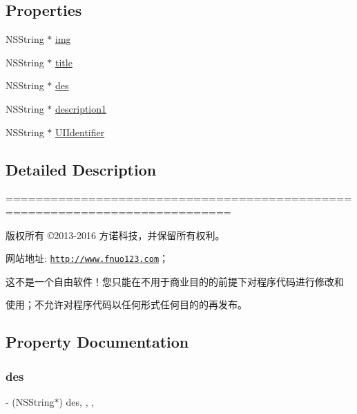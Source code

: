 \subsection*{Properties}
\begin{DoxyCompactItemize}
\item 
N\+S\+String $\ast$ \mbox{\hyperlink{interface_j_m_hi_buy_home_a_d_model_a31a8092309d30f01e0233e3afb662d29}{img}}
\item 
N\+S\+String $\ast$ \mbox{\hyperlink{interface_j_m_hi_buy_home_a_d_model_a1b33b36813e76156e9b6e4f3e2c71eea}{title}}
\item 
N\+S\+String $\ast$ \mbox{\hyperlink{interface_j_m_hi_buy_home_a_d_model_a9dd233c0678f678025b0b8998f6b8e8c}{des}}
\item 
N\+S\+String $\ast$ \mbox{\hyperlink{interface_j_m_hi_buy_home_a_d_model_ab7007b10dc44feb80b3946c683c6dd31}{description1}}
\item 
N\+S\+String $\ast$ \mbox{\hyperlink{interface_j_m_hi_buy_home_a_d_model_a8c115705a0f60975fe8e8d76936850d3}{U\+I\+Identifier}}
\end{DoxyCompactItemize}


\subsection{Detailed Description}
============================================================================

版权所有 ©2013-\/2016 方诺科技，并保留所有权利。

网站地址\+: \href{http://www.fnuo123.com}{\tt http\+://www.\+fnuo123.\+com}； 



这不是一个自由软件！您只能在不用于商业目的的前提下对程序代码进行修改和

使用；不允许对程序代码以任何形式任何目的的再发布。 

 

\subsection{Property Documentation}
\mbox{\label{interface_j_m_hi_buy_home_a_d_model_a9dd233c0678f678025b0b8998f6b8e8c}} 
\subsubsection{\texorpdfstring{des}{des}}
{\footnotesize\ttfamily -\/ (N\+S\+String$\ast$) des\hspace{0.3cm}{\ttfamily [read]}, {\ttfamily [write]}, {\ttfamily [nonatomic]}, {\ttfamily [copy]}}

